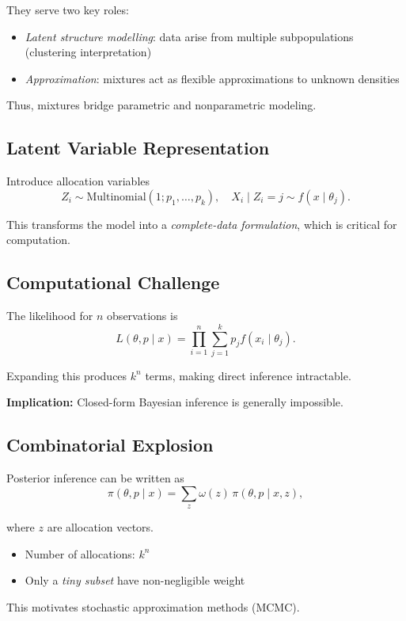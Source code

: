 \documentclass[12pt,oneside]{book}
\numberwithin{equation}{section}
\theoremstyle{definition}
\theoremstyle{plain}
\theoremstyle{remark}
\begin{document}
They serve two key roles:

\begin{itemize}
\item \emph{Latent structure modelling}: data arise from multiple subpopulations (clustering interpretation)
\item \emph{Approximation}: mixtures act as flexible approximations to unknown densities
\end{itemize}

Thus, mixtures bridge parametric and nonparametric modeling.  

\subsection*{Latent Variable Representation}

Introduce allocation variables
\[
Z_i \sim \text{Multinomial}(1; p_1,\dots,p_k), \quad X_i \mid Z_i = j \sim f(x \mid \theta_j).
\]

This transforms the model into a \emph{complete-data formulation}, which is critical for computation.

\subsection*{Computational Challenge}

The likelihood for $n$ observations is
\[
L(\theta,p \mid x) = \prod_{i=1}^n \sum_{j=1}^k p_j f(x_i \mid \theta_j).
\]

Expanding this produces $k^n$ terms, making direct inference intractable.  

\textbf{Implication:} Closed-form Bayesian inference is generally impossible.

\subsection*{Combinatorial Explosion}

Posterior inference can be written as
\[
\pi(\theta,p \mid x)
=
\sum_{z} \omega(z)\,\pi(\theta,p \mid x,z),
\]

where $z$ are allocation vectors.

\begin{itemize}
\item Number of allocations: $k^n$
\item Only a \emph{tiny subset} have non-negligible weight
\end{itemize}

This motivates stochastic approximation methods (MCMC).  
\end{document}
